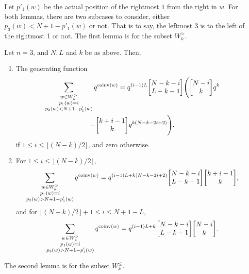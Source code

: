 \documentclass[ALCO,Unicode]{cedram}
\DeclareMathOperator{\coinv}{coinv}
\newcommand{\qbinom}[2]{\bgroup\renewcommand*{\arraystretch}{1}\begin{bmatrix} #1 \\ #2\end{bmatrix} \egroup}
\begin{document}
Let $p'_1(w)$ be the actual position of the rightmost $1$ from the right in $w$.
For both lemmas, there are two subcases to consider, either $p_3(w) < N+1 - p'_1(w)$ or not.
That is to say, the leftmost 3 is to the left of the rightmost 1 or not. The first lemma is for the subset $W_k^>$.

\begin{lemma}
\label{lem:quinv>}
Let $n=3$, and $N, L$ and $k$ be as above. Then, 
\begin{enumerate}[label=(\arabic*)]
\item \label{it3vvt1}
The generating function
\begin{multline}
\label{quinv>l}
\sum_{\substack{ w \in W_k^> \\ p_1(w) = i \\ p_3(w) < N+1 - p'_1(w)}} q^{\coinv(w)} = q^{ (i-1) L} 
\qbinom{N-k-i}{L-k-1} \Bigg( \qbinom {N-i}k q^k \\
 - \qbinom{k+i-1}k q^{k(N-k-2i+2)} \Bigg),
\end{multline}
if $1 \leq i \leq \lfloor (N-k)/2 \rfloor$, and zero otherwise.

\item \label{it3vvt2}
For $1 \leq i \leq \lfloor (N-k)/2 \rfloor$,
\begin{equation}
\label{quinv>r1}
\sum_{\substack{ w \in W_k^> \\ p_1(w) = i \\ p_3(w) > N+1 - p'_1(w)}} q^{\coinv(w)} = q^{ (i-1) L + k(N-k-2i+2)} 
\qbinom{N-k-i}{L-k-1} \qbinom{k+i-1}k,
\end{equation}
and for $\lfloor (N-k)/2 \rfloor + 1 \leq i \leq N +1 - L$,
\begin{equation}
\label{quinv>r2}
\sum_{\substack{ w \in W_k^> \\ p_1(w) = i \\ p_3(w) > N+1 - p'_1(w)}} q^{\coinv(w)} = q^{ (i-1) L + k} 
\qbinom{N-k-i}{L-k-1} \qbinom {N-i}k.
\end{equation}
\end{enumerate}
\end{lemma}

The second lemma is for the subset $W_k^\leq$.
\end{document}
